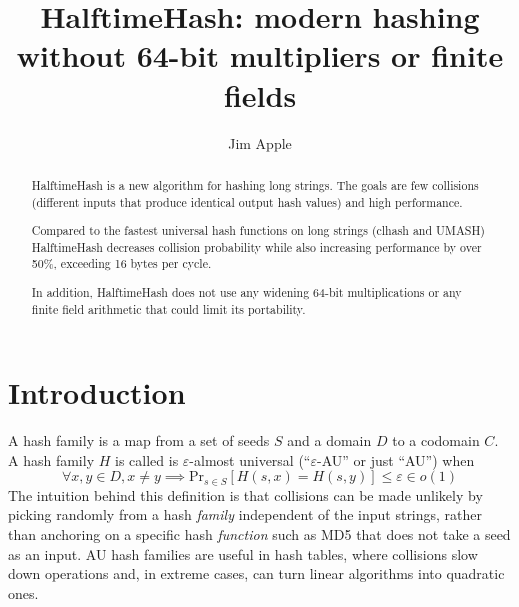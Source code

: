 \documentclass[runningheads]{llncs}
\begin{document}
\title{HalftimeHash: modern hashing without 64-bit multipliers or finite fields}
\author{Jim Apple
}


\maketitle


\begin{abstract}
HalftimeHash is a new algorithm for hashing long strings.
The goals are few collisions (different inputs that produce identical output hash values) and high performance.

Compared to the fastest universal hash functions on long strings (clhash and UMASH) HalftimeHash decreases collision probability while also increasing performance by over 50\%, exceeding 16 bytes per cycle.

In addition, HalftimeHash does not use any widening 64-bit multiplications or any finite field arithmetic that could limit its portability.

\end{abstract}

\section{Introduction}
A hash family is a map from a set of seeds $S$ and a domain $D$ to a codomain $C$.
A hash family $H$ is called is $\varepsilon$-almost universal (``$\varepsilon$-AU'' or just ``AU'') when
\[
\forall x,y \in D, x \neq y \implies \mathrm{Pr}_{s \in S}[H(s, x) = H(s, y)] \leq \varepsilon \in o(1)
\]
The intuition behind this definition is that collisions can be made unlikely by picking randomly from a hash {\em family} independent of the input strings, rather than anchoring on a specific hash {\em function} such as MD5 that does not take a seed as an input. AU hash families are useful in hash tables, where collisions slow down operations and, in extreme cases, can turn linear algorithms into quadratic ones. \cite{tabulation,rust-quadratic,impala-quadratic,algorithm-attack}
\end{document}
